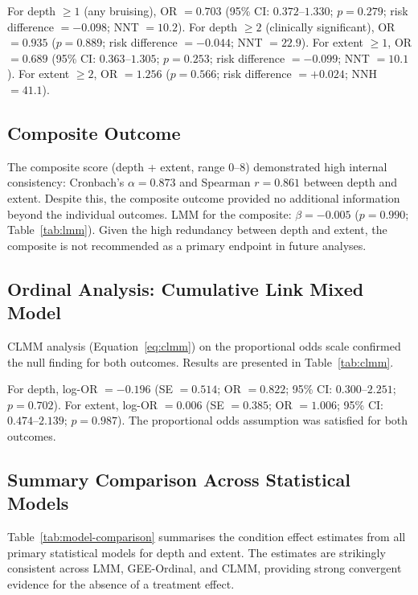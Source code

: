 

For depth $\geq 1$ (any bruising), OR $= 0.703$ (95\% CI: $0.372$--$1.330$; $p = 0.279$; risk difference $= -0.098$; NNT $= 10.2$). For depth $\geq 2$ (clinically significant), OR $= 0.935$ ($p = 0.889$; risk difference $= -0.044$; NNT $= 22.9$). For extent $\geq 1$, OR $= 0.689$ (95\% CI: $0.363$--$1.305$; $p = 0.253$; risk difference $= -0.099$; NNT $= 10.1$). For extent $\geq 2$, OR $= 1.256$ ($p = 0.566$; risk difference $= +0.024$; NNH $= 41.1$).

\subsection{Composite Outcome}

The composite score (depth + extent, range 0--8) demonstrated high internal consistency: Cronbach's $\alpha = 0.873$ and Spearman $r = 0.861$ between depth and extent. Despite this, the composite outcome provided no additional information beyond the individual outcomes. LMM for the composite: $\beta = -0.005$ ($p = 0.990$; Table~\ref{tab:lmm}). Given the high redundancy between depth and extent, the composite is not recommended as a primary endpoint in future analyses.

\subsection{Ordinal Analysis: Cumulative Link Mixed Model}

CLMM analysis (Equation~\ref{eq:clmm}) on the proportional odds scale confirmed the null finding for both outcomes. Results are presented in Table~\ref{tab:clmm}.



For depth, log-OR $= -0.196$ (SE $= 0.514$; OR $= 0.822$; 95\% CI: $0.300$--$2.251$; $p = 0.702$). For extent, log-OR $= 0.006$ (SE $= 0.385$; OR $= 1.006$; 95\% CI: $0.474$--$2.139$; $p = 0.987$). The proportional odds assumption was satisfied for both outcomes.

\subsection{Summary Comparison Across Statistical Models}

Table~\ref{tab:model-comparison} summarises the condition effect estimates from all primary statistical models for depth and extent. The estimates are strikingly consistent across LMM, GEE-Ordinal, and CLMM, providing strong convergent evidence for the absence of a treatment effect.


